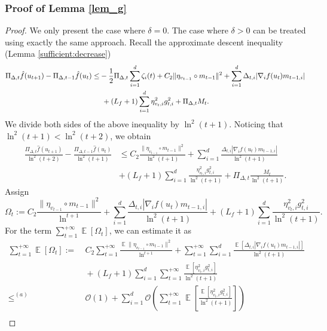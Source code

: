 \documentclass{article} %
\DeclareMathOperator{\Expect}{\mathbb{E}}
\begin{document}
\subsubsection{Proof of Lemma \ref{lem_g}}
\begin{proof}
We only present the case where $\delta = 0$. The case where $\delta > 0$ can be treated using exactly the same approach. Recall the approximate descent inequality (Lemma \ref{sufficient:decrease})
\begin{align*}
\Pi_{\Delta,t}\hat{f}(u_{t+1})-\Pi_{\Delta,t-1}\hat{f}(u_{t})\le& -\frac{1}{2}\Pi_{\Delta,t}\sum_{i=1}^{d}\zeta_{i}(t)\notag+C_{2}\|{\eta_{v_{t-1}}}\circ m_{t-1}\|^{2}+\sum_{i=1}^{d}\Delta_{t,i}|\nabla_{i} f(u_{t})m_{t-1,i}|\\&\ +(L_{f}+1)\sum_{i=1}^{d}\eta_{v_{t},i}^{2}g_{t,i}^{2}+\Pi_{\Delta,t}M_{t}.
\end{align*}
We divide both sides of the above inequality by $\ln^{2}(t+1)$. Noticing that $\ln^{2}(t+1) < \ln^{2}(t+2)$, we obtain
\begin{align}\label{adam_7980}
\frac{\Pi_{\Delta,t}\hat{f}(u_{t+1})}{\ln^{2}(t+2)}-\frac{\Pi_{\Delta,t-1}\hat{f}(u_{t})}{\ln^{2}(t+1)}&\le C_{2}\frac{\|{\eta_{v_{t-1}}}\circ m_{t-1}\|^{2}}{\ln^{2}(t+1)}+\sum_{i=1}^{d}\frac{\Delta_{t,i}|\nabla_{i} f(u_{t})m_{t-1,i}|}{\ln^{2}(t+1)}\\&+(L_{f}+1)\sum_{i=1}^{d}\frac{\eta_{v_{t},i}^{2}g_{t,i}^{2}}{\ln^{2}(t+1)}+\Pi_{\Delta,t}\frac{M_{t}}{\ln^{2}(t+1)}.%
\end{align}
Assign
$$\Omega_{t}:=C_{2}\frac{\|{\eta_{v_{t-1}}}\circ m_{t-1}\|^{2}}{\ln^{t+1}}+\sum_{i=1}^{d}\frac{\Delta_{t,i}|\nabla_{i} f(u_{t})m_{t-1,i}|}{\ln^{2}(t+1)}+(L_{f}+1)\sum_{i=1}^{d}\frac{\eta_{v_{t},i}^{2}g_{t,i}^{2}}{\ln^{2}(t+1)}.$$
For the term \(\sum_{t=1}^{+\infty} \Expect[\Omega_{t}]\), we can estimate it as 
\begin{align*}
\sum_{t=1}^{+\infty}\Expect[\Omega_{t}]:=&\ C_{2}\sum_{t=1}^{+\infty}\frac{\Expect\|{\eta_{v_{t-1}}}\circ m_{t-1}\|^{2}}{\ln^{t+1}}+\sum_{t=1}^{+\infty}\sum_{i=1}^{d}\frac{\Expect[\Delta_{t,i}|\nabla_{i} f(u_{t})m_{t-1,i}|]}{\ln^{2}(t+1)}\\&\ +(L_{f}+1)\sum_{i=1}^{d}\sum_{t=1}^{+\infty}\frac{\Expect[\eta_{v_{t},i}^{2}g_{t,i}^{2}]}{\ln^{2}(t+1)}\\ \mathop{\le}^{(a)} &\ \mathcal{O}(1)+\sum_{i=1}^{d}\mathcal{O}\left(\sum_{t=1}^{+\infty}\Expect\left[\frac{\Expect[\eta_{v_{t},i}^{2}g_{t,i}^{2}]}{\ln^{2}(t+1)}\right]\right)\\

\end{align*}
\end{proof}
\end{document}
